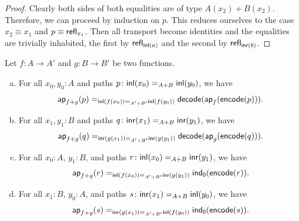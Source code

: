 \begin{proof}
    Clearly both sides of both equalities are of type $A(x_2)+B(x_2)$. Therefore, we can proceed by induction on $p$. This reduces ourselves to the case $x_2\equiv x_1$ and $p\equiv\mathsf{refl}_{x_1}$. Then all transport become identities and the equalities are trivially inhabited, the first by $\mathsf{refl}_{\mathsf{inl}(a)}$ and the second by $\mathsf{refl}_{\mathsf{inr}(b)}$.
\end{proof}

\begin{thm}\label{thm:pair-f+g}
    Let\/ $f\colon A\to A'$ and\/ $g\colon B\to B'$ be two functions.
    \begin{enumerate}[a),font=\upshape]
        \item For all\/ $x_0,y_0\colon A$ and paths\/ $p\colon\fun{inl}(x_0)\eq{A+B}\fun{inl}(y_0)$, we have
        \[
            \mathsf{ap}_{f+g}(p)
            \mathrel{=_{\mathsf{inl}(f(x_0))\mathrel{=_{A'+B'}}\mathsf{inl}(f(y_0))}}
            \mathsf{decode}(\mathsf{ap}_f(\mathsf{encode}(p))).
        \]
        
        \item For all\/ $x_1,y_1\colon B$ and paths\/ $q\colon\fun{inr}(x_1)\eq{A+B}\fun{inr}(y_1)$, we have
        \[
            \mathsf{ap}_{f+g}(q)
            \mathrel{=_{\mathsf{inr}(g(x_1))\mathrel{=_{A'+B'}}\mathsf{inr}(g(y_1))}}
            \mathsf{decode}(\mathsf{ap}_g(\mathsf{encode}(q))).
        \]
        
        \item For all\/ $x_0\colon A$,\/ $y_1\colon B$, and paths\/ $r\colon\fun{inl}(x_0)\eq{A+B}\fun{inr}(y_1)$, we have
        \[
            \mathsf{ap}_{f+g}(r)
            \mathrel{=_{\mathsf{inl}(f(x_0))\mathrel{=_{A'+B'}}\mathsf{inr}(g(y_1))}}
            \mathsf{ind}_{\mathsf{0}}(\mathsf{encode}(r)).
        \]
        
        \item For all\/ $x_1\colon B$,\/ $y_0\colon A$, and paths\/ $s\colon\fun{inr}(x_1)\eq{A+B}\fun{inl}(y_0)$, we have
        \[
            \mathsf{ap}_{f+g}(s)
            \mathrel{=_{\mathsf{inr}(g(x_1))\mathrel{=_{A'+B'}}\mathsf{inl}(f(y_0))}}
            \mathsf{ind}_{\mathsf{0}}(\mathsf{encode}(s)).
        \]
    \end{enumerate}
\end{thm}

